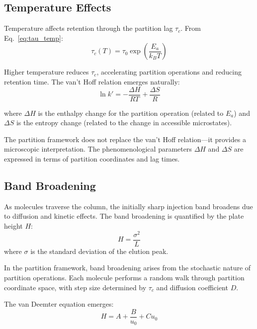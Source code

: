 \documentclass[twocolumn,superscriptaddress,prb,10pt]{revtex4-2}
\begin{document}
\subsection{Temperature Effects}

Temperature affects retention through the partition lag $\tau_c$. From Eq.~\ref{eq:tau_temp}:
\begin{equation}
\tau_c(T) = \tau_0 \exp\left(\frac{E_a}{k_B T}\right)
\label{eq:tau_temp_chrom}
\end{equation}

Higher temperature reduces $\tau_c$, accelerating partition operations and reducing retention time. The van't Hoff relation emerges naturally:
\begin{equation}
\ln k' = -\frac{\Delta H}{RT} + \frac{\Delta S}{R}
\label{eq:vant_hoff}
\end{equation}

where $\Delta H$ is the enthalpy change for the partition operation (related to $E_a$) and $\Delta S$ is the entropy change (related to the change in accessible microstates).

The partition framework does not replace the van't Hoff relation—it provides a microscopic interpretation. The phenomenological parameters $\Delta H$ and $\Delta S$ are expressed in terms of partition coordinates and lag times.

\subsection{Band Broadening}

As molecules traverse the column, the initially sharp injection band broadens due to diffusion and kinetic effects. The band broadening is quantified by the plate height $H$:
\begin{equation}
H = \frac{\sigma^2}{L}
\label{eq:plate_height}
\end{equation}
where $\sigma$ is the standard deviation of the elution peak.

In the partition framework, band broadening arises from the stochastic nature of partition operations. Each molecule performs a random walk through partition coordinate space, with step size determined by $\tau_c$ and diffusion coefficient $D$.

The van Deemter equation emerges:
\begin{equation}
H = A + \frac{B}{u_0} + C u_0
\label{eq:van_deemter}
\end{equation}
\end{document}
